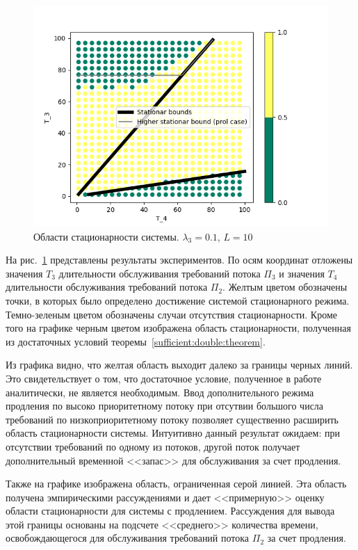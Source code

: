 \documentclass[a4paper,12pt,russian]{extarticle}
\begin{document}
\begin{figure}[h]
\centering
\includegraphics[scale=0.85]{0_1_thres_10_target_fact_.png} 
\caption{Области стационарности системы. $\lambda_3=0.1$, $L=10$}
\label{Experiment:stationar}
\end{figure}
На рис.~\ref{Experiment:stationar} представлены результаты экспериментов. По осям координат отложены значения $T_3$ длительности обслуживания требований потока $\Pi_3$ и значения $T_4$ длительности обслуживания требований потока $\Pi_2$. Желтым цветом обозначены точки, в которых было определено достижение системой стационарного режима. Темно-зеленым цветом обозначены случаи отсутствия стационарности. Кроме того на графике черным цветом изображена область стационарности, полученная из достаточных условий теоремы~\ref{sufficient:double:theorem}. 

Из графика видно, что желтая область выходит далеко за границы черных линий. Это свидетельствует о том, что достаточное условие, полученное в работе аналитически, не является необходимым. Ввод дополнительного режима продления по высоко приоритетному потоку при отсутвии большого числа требований по низкоприоритетному потоку позволяет существенно расширить область стационарности системы. Интуитивно данный результат ожидаем: при отсутствии требований по одному из потоков, другой поток получает дополнительный временной <<запас>> для обслуживания за счет продления.

Также на графике изображена область, ограниченная серой линией. Эта область получена эмпирическими рассуждениями и дает <<примерную>> оценку области стационарности для системы с продлением. Рассуждения для вывода этой границы основаны на подсчете <<среднего>> количества времени, освобождающегося для обслуживания требований потока $\Pi_2$ за счет продления.
\end{document}
